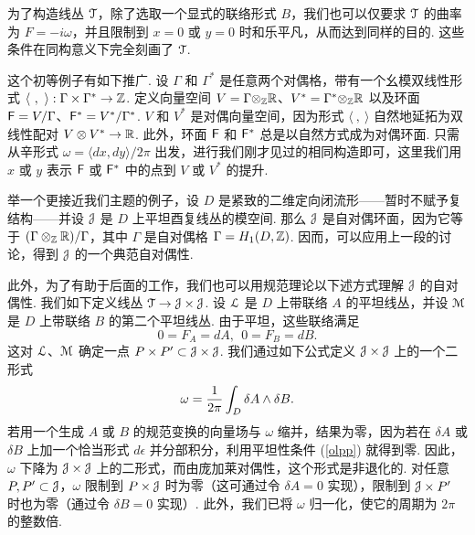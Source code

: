 为了构造线丛 ${\cal T}$，除了选取一个显式的联络形式 $B$，我们也可以仅要求 ${\cal T}$ 的曲率为 $F=-i\omega$，并且限制到 $x=0$ 或 $y=0$ 时和乐平凡，从而达到同样的目的. 这些条件在同构意义下完全刻画了 ${\cal T}$.

这个初等例子有如下推广. 设 $\Gamma$ 和 $\Gamma^*$ 是任意两个对偶格，带有一个幺模双线性形式 $\langle ~,~\rangle:\Gamma\times
\Gamma^*\to \Bbb{Z}$. 定义向量空间 $V=\Gamma{\otimes}_{\Bbb{Z}}\Bbb{R}$、$V^*=\Gamma^*{\otimes}
_{\Bbb{Z}}\Bbb{R}$ 以及环面 $\cF=V/\Gamma$、$\cF^*=V^*/\Gamma^*$. $V$ 和 $V^*$ 是对偶向量空间，因为形式 $\langle~,~\rangle$ 自然地延拓为双线性配对 $V\otimes V^*\to \Bbb{R}$. 此外，环面 $\cF$ 和 $\cF^*$ 总是以自然方式成为对偶环面. 只需从辛形式 $\omega=\langle dx,dy\rangle/2\pi$ 出发，进行我们刚才见过的相同构造即可，这里我们用 $x$ 或 $y$ 表示 $\cF$ 或 $\cF^*$ 中的点到 $V$ 或 $V^*$ 的提升.

举一个更接近我们主题的例子，设 $D$ 是紧致的二维定向闭流形——暂时不赋予复结构——并设 ${\cal J}$ 是 $D$ 上平坦酉复线丛的模空间. 那么 ${\cal J}$ 是自对偶环面，因为它等于 $(\Gamma\otimes_{\Bbb{Z}}\Bbb{R})/\Gamma$，其中 $\Gamma$ 是自对偶格 $\Gamma= H_1(D,\Bbb{Z})$. 因而，可以应用上一段的讨论，得到 ${\cal J}$ 的一个典范自对偶性.

此外，为了有助于后面的工作，我们也可以用规范理论以下述方式理解 ${\cal J}$ 的自对偶性. 我们如下定义线丛 ${\cal T}\to {\cal J}\times {\cal J}$. 设 ${\cal L}$ 是 $D$ 上带联络 $A$ 的平坦线丛，并设 ${\cal M}$ 是 $D$ 上带联络 $B$ 的第二个平坦线丛. 由于平坦，这些联络满足
\begin{equation}
\label{olpp}
0=F_A=dA,~~0=F_B=dB.
\end{equation}
这对 ${\cal L}$、${\cal M}$ 确定一点 $P\times P'\subset
{\cal J}\times {\cal J}$. 我们通过如下公式定义 ${\cal J}\times {\cal J}$ 上的一个二形式
\begin{equation}
\label{ivo} \omega={1\over 2\pi}\int_{D}\delta A\wedge \delta B.
\end{equation}
若用一个生成 $A$ 或 $B$ 的规范变换的向量场与 $\omega$ 缩并，结果为零，因为若在 $\delta A$ 或 $\delta B$ 上加一个恰当形式 $d\epsilon$ 并分部积分，利用平坦性条件 (\ref{olpp}) 就得到零. 因此，$\omega$ 下降为 ${\cal J}\times {\cal J}$ 上的二形式，而由庞加莱对偶性，这个形式是非退化的. 对任意 $P,P'\subset {\cal J}$，$\omega$ 限制到 $P\times {\cal J}$ 时为零（这可通过令 $\delta A=0$ 实现），限制到 ${\cal J}\times P'$ 时也为零（通过令 $\delta B=0$ 实现）. 此外，我们已将 $\omega$ 归一化，使它的周期为 $2\pi$ 的整数倍.

